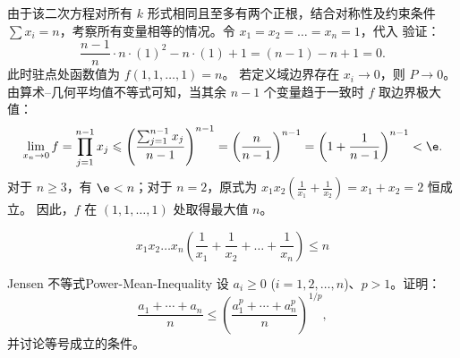\begin{myproof}
\begin{equation}
    \end{equation}
    由于该二次方程对所有 $k$ 形式相同且至多有两个正根，结合对称性及约束条件 $\sum x_i = n$，考察所有变量相等的情况。令 $x_1 = x_2 = \dots = x_n = 1$，代入  验证：
    \begin{equation}
        \frac{n-1}{n} \cdot n \cdot (1)^2 - n \cdot (1) + 1 = (n-1) - n + 1 = 0.
    \end{equation}
    此时驻点处函数值为 $f(1, 1, \dots, 1) = n$。
    若定义域边界存在 $x_i \to 0$，则 $P \to 0$。由算术--几何平均值不等式可知，当其余 $n-1$ 个变量趋于一致时 $f$ 取边界极大值：
    \begin{equation}
        \lim_{x_n \to 0} f = \prod_{j=1}^{n-1} x_j \leqslant \left( \frac{\sum_{j=1}^{n-1} x_j}{n-1} \right)^{n-1} = \left( \frac{n}{n-1} \right)^{n-1} = \left( 1 + \frac{1}{n-1} \right)^{n-1} < \e.
    \end{equation}
    对于 $n \geqslant 3$，有 $\e < n$；对于 $n=2$，原式为 $x_1 x_2 (\frac{1}{x_1} + \frac{1}{x_2}) = x_1 + x_2 = 2$ 恒成立。
    因此，$f$ 在 $(1, 1, \dots, 1)$ 处取得最大值 $n$。

    \begin{equation}
        \boxed{x_1 x_2 \dots x_n \left( \frac{1}{x_1} + \frac{1}{x_2} + \dots + \frac{1}{x_n} \right) \leqslant n}
    \end{equation}
\end{myproof}




\begin{problem}{Jensen 不等式}{Power-Mean-Inequality}
    设 $a_i \ge 0$ ($i = 1, 2, \dots, n$)、$p > 1$。证明：
    \begin{equation}
        \frac{a_1 + \cdots + a_n}{n} \le \left( \frac{a_1^p + \cdots + a_n^p}{n} \right)^{1/p},
    \end{equation}
    并讨论等号成立的条件。
\end{problem}

